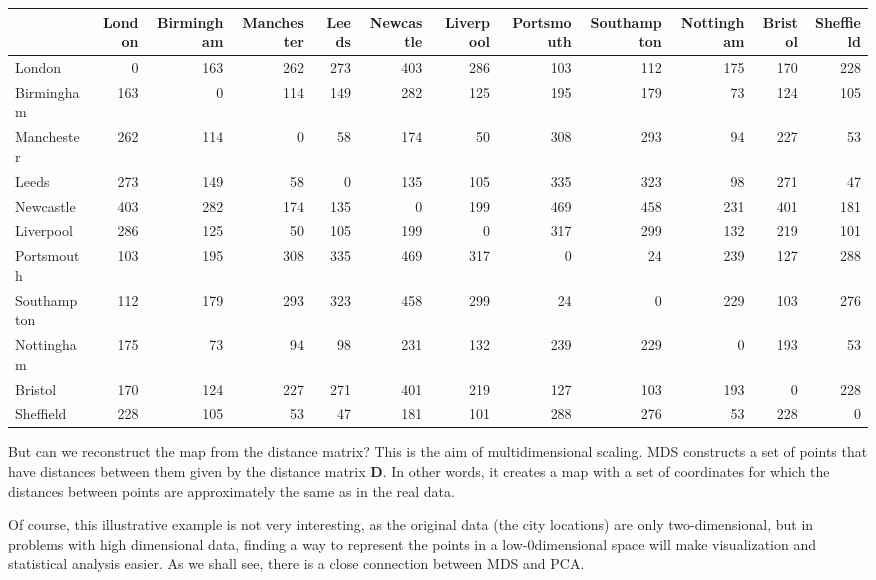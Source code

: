 \documentclass[]{book}
\theoremstyle{definition}
\theoremstyle{definition}
\theoremstyle{definition}
\theoremstyle{remark}
\begin{document}
\begin{table}[H]
\centering\begingroup\fontsize{7}{9}\selectfont

\begin{tabular}{lrrrrrrrrrrr}
\toprule
  & London & Birmingham & Manchester & Leeds & Newcastle & Liverpool & Portsmouth & Southampton & Nottingham & Bristol & Sheffield\\
\midrule
London & 0 & 163 & 262 & 273 & 403 & 286 & 103 & 112 & 175 & 170 & 228\\
Birmingham & 163 & 0 & 114 & 149 & 282 & 125 & 195 & 179 & 73 & 124 & 105\\
Manchester & 262 & 114 & 0 & 58 & 174 & 50 & 308 & 293 & 94 & 227 & 53\\
Leeds & 273 & 149 & 58 & 0 & 135 & 105 & 335 & 323 & 98 & 271 & 47\\
Newcastle & 403 & 282 & 174 & 135 & 0 & 199 & 469 & 458 & 231 & 401 & 181\\
\addlinespace
Liverpool & 286 & 125 & 50 & 105 & 199 & 0 & 317 & 299 & 132 & 219 & 101\\
Portsmouth & 103 & 195 & 308 & 335 & 469 & 317 & 0 & 24 & 239 & 127 & 288\\
Southampton & 112 & 179 & 293 & 323 & 458 & 299 & 24 & 0 & 229 & 103 & 276\\
Nottingham & 175 & 73 & 94 & 98 & 231 & 132 & 239 & 229 & 0 & 193 & 53\\
Bristol & 170 & 124 & 227 & 271 & 401 & 219 & 127 & 103 & 193 & 0 & 228\\
\addlinespace
Sheffield & 228 & 105 & 53 & 47 & 181 & 101 & 288 & 276 & 53 & 228 & 0\\
\bottomrule
\end{tabular}
\endgroup{}
\end{table}

But can we reconstruct the map from the distance matrix? This is the aim of multidimensional scaling.
MDS constructs a set of points that have distances between them given by the distance matrix \(\boldsymbol D\). In other words, it creates a map with a set of coordinates for which the distances between points are approximately the same as in the real data.

Of course, this illustrative example is not very interesting, as the original data (the city locations) are only two-dimensional, but in problems with high dimensional data, finding a way to
represent the points in a low-0dimensional space will make visualization and statistical analysis easier. As we shall see, there is a close connection between MDS and PCA.
\end{document}
